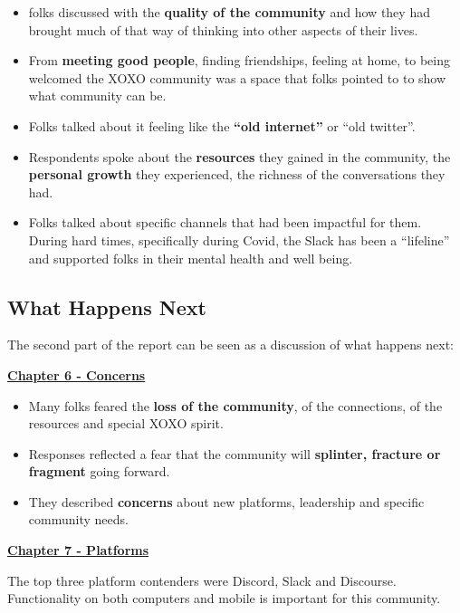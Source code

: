 \documentclass[
]{book}
\providecommand{\tightlist}{%
  \setlength{\itemsep}{0pt}\setlength{\parskip}{0pt}}
\begin{document}
\begin{itemize}
\tightlist
\item
  folks discussed with the \textbf{quality of the community} and how they had brought much of that way of thinking into other aspects of their lives.
\item
  From \textbf{meeting good people}, finding friendships, feeling at home, to being welcomed the XOXO community was a space that folks pointed to to show what community can be.
\item
  Folks talked about it feeling like the \textbf{``old internet''} or ``old twitter''.
\item
  Respondents spoke about the \textbf{resources} they gained in the community, the \textbf{personal growth} they experienced, the richness of the conversations they had.
\item
  Folks talked about specific channels that had been impactful for them. During hard times, specifically during Covid, the Slack has been a ``lifeline'' and supported folks in their mental health and well being.
\end{itemize}

\subsection{What Happens Next}\label{what-happens-next}

The second part of the report can be seen as a discussion of what happens next:

\textbf{\href{https://bduckles.github.io/XOXOReport_BD/concerns.html}{Chapter 6 - Concerns}}

\begin{itemize}
\tightlist
\item
  Many folks feared the \textbf{loss of the community}, of the connections, of the resources and special XOXO spirit.\\
\item
  Responses reflected a fear that the community will \textbf{splinter, fracture or fragment} going forward.
\item
  They described \textbf{concerns} about new platforms, leadership and specific community needs.
\end{itemize}

\textbf{\href{https://bduckles.github.io/XOXOReport_BD/platforms.html}{Chapter 7 - Platforms}}

The top three platform contenders were Discord, Slack and Discourse. Functionality on both computers and mobile is important for this community.
\end{document}
